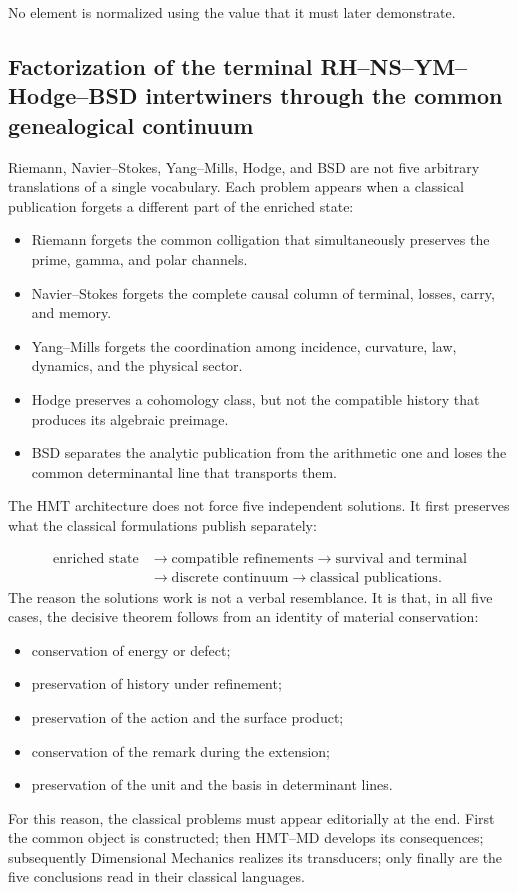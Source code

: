 No element is normalized using the value that it must later demonstrate.\par
{}
\subsection{Factorization of the terminal RH--NS--YM--Hodge--BSD intertwiners through the common genealogical continuum}
Riemann, Navier–Stokes, Yang–Mills, Hodge, and BSD are not five arbitrary translations of a single vocabulary. Each problem appears when a classical publication forgets a different part of the enriched state:\par
\begin{itemize}
\item Riemann forgets the common colligation that simultaneously preserves the prime, gamma, and polar channels.
\item Navier--Stokes forgets the complete causal column of terminal, losses, carry, and memory.
\item Yang--Mills forgets the coordination among incidence, curvature, law, dynamics, and the physical sector.
\item Hodge preserves a cohomology class, but not the compatible history that produces its algebraic preimage.
\item BSD separates the analytic publication from the arithmetic one and loses the common determinantal line that transports them.
\end{itemize}
The HMT architecture does not force five independent solutions. It first preserves what the classical formulations publish separately:\par
\[
\begin{aligned}
\text{enriched state}
&\longrightarrow \text{compatible refinements}
\longrightarrow \text{survival and terminal}\\
&\longrightarrow \text{discrete continuum}
\longrightarrow \text{classical publications}.
\end{aligned}
\]
The reason the solutions work is not a verbal resemblance. It is that, in all five cases, the decisive theorem follows from an identity of material conservation:\par
\begin{itemize}
\item conservation of energy or defect;
\item preservation of history under refinement;
\item preservation of the action and the surface product;
\item conservation of the remark during the extension;
\item preservation of the unit and the basis in determinant lines.
\end{itemize}
For this reason, the classical problems must appear editorially at the end. First the common object is constructed; then HMT–MD develops its consequences; subsequently Dimensional Mechanics realizes its transducers; only finally are the five conclusions read in their classical languages.\par
{}
